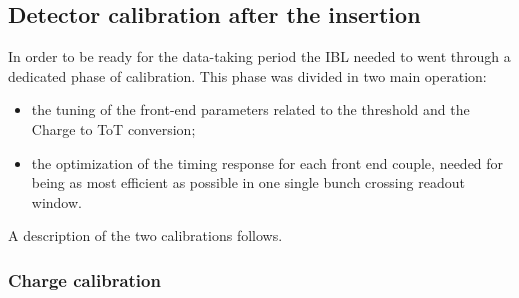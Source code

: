 
\subsection{Detector calibration after the insertion}
In order to be ready for the data-taking period the IBL needed to went through a dedicated phase of calibration. This phase was divided in two main operation:
\begin{itemize}
\item the tuning of the front-end parameters related to the threshold and the Charge to ToT conversion;
\item the optimization of the timing response for each front end couple, needed for being as most efficient as possible in one single bunch crossing readout window.
\end{itemize}


A description of the two calibrations follows.

\subsubsection{Charge calibration}

